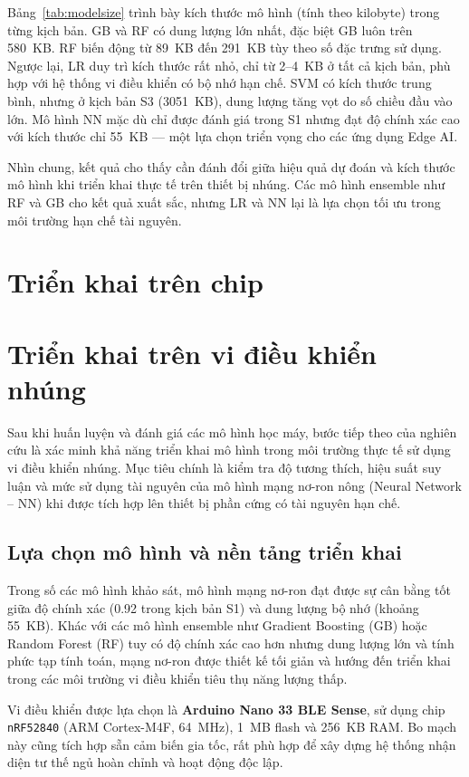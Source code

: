 Bảng~\ref{tab:modelsize} trình bày kích thước mô hình (tính theo kilobyte) trong từng kịch bản. GB và RF có dung lượng lớn nhất, đặc biệt GB luôn trên 580~KB. RF biến động từ 89~KB đến 291~KB tùy theo số đặc trưng sử dụng. Ngược lại, LR duy trì kích thước rất nhỏ, chỉ từ 2–4~KB ở tất cả kịch bản, phù hợp với hệ thống vi điều khiển có bộ nhớ hạn chế. SVM có kích thước trung bình, nhưng ở kịch bản S3 (3051~KB), dung lượng tăng vọt do số chiều đầu vào lớn. Mô hình NN mặc dù chỉ được đánh giá trong S1 nhưng đạt độ chính xác cao với kích thước chỉ 55~KB — một lựa chọn triển vọng cho các ứng dụng Edge AI.

Nhìn chung, kết quả cho thấy cần đánh đổi giữa hiệu quả dự đoán và kích thước mô hình khi triển khai thực tế trên thiết bị nhúng. Các mô hình ensemble như RF và GB cho kết quả xuất sắc, nhưng LR và NN lại là lựa chọn tối ưu trong môi trường hạn chế tài nguyên.

\section{Triển khai trên chip}

\section{Triển khai trên vi điều khiển nhúng}

Sau khi huấn luyện và đánh giá các mô hình học máy, bước tiếp theo của nghiên cứu là xác minh khả năng triển khai mô hình trong môi trường thực tế sử dụng vi điều khiển nhúng. Mục tiêu chính là kiểm tra độ tương thích, hiệu suất suy luận và mức sử dụng tài nguyên của mô hình mạng nơ-ron nông (Neural Network – NN) khi được tích hợp lên thiết bị phần cứng có tài nguyên hạn chế.

\subsection{Lựa chọn mô hình và nền tảng triển khai}

Trong số các mô hình khảo sát, mô hình mạng nơ-ron đạt được sự cân bằng tốt giữa độ chính xác (0.92 trong kịch bản S1) và dung lượng bộ nhớ (khoảng 55~KB). Khác với các mô hình ensemble như Gradient Boosting (GB) hoặc Random Forest (RF) tuy có độ chính xác cao hơn nhưng dung lượng lớn và tính phức tạp tính toán, mạng nơ-ron được thiết kế tối giản và hướng đến triển khai trong các môi trường vi điều khiển tiêu thụ năng lượng thấp.

Vi điều khiển được lựa chọn là \textbf{Arduino Nano 33 BLE Sense}, sử dụng chip \texttt{nRF52840} (ARM Cortex-M4F, 64~MHz), 1~MB flash và 256~KB RAM. Bo mạch này cũng tích hợp sẵn cảm biến gia tốc, rất phù hợp để xây dựng hệ thống nhận diện tư thế ngủ hoàn chỉnh và hoạt động độc lập.

